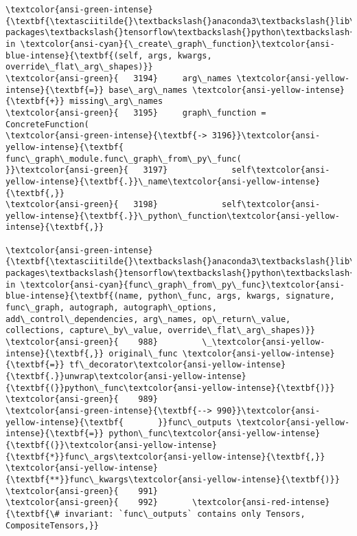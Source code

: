 \documentclass[11pt]{article}
\begin{document}
\begin{Verbatim}[commandchars=\\\{\}, frame=single, framerule=2mm, rulecolor=\color{outerrorbackground}]
\textcolor{ansi-green-intense}{\textbf{\textasciitilde{}\textbackslash{}anaconda3\textbackslash{}lib\textbackslash{}site-packages\textbackslash{}tensorflow\textbackslash{}python\textbackslash{}eager\textbackslash{}function.py}} in \textcolor{ansi-cyan}{\_create\_graph\_function}\textcolor{ansi-blue-intense}{\textbf{(self, args, kwargs, override\_flat\_arg\_shapes)}}
\textcolor{ansi-green}{   3194}     arg\_names \textcolor{ansi-yellow-intense}{\textbf{=}} base\_arg\_names \textcolor{ansi-yellow-intense}{\textbf{+}} missing\_arg\_names
\textcolor{ansi-green}{   3195}     graph\_function = ConcreteFunction(
\textcolor{ansi-green-intense}{\textbf{-> 3196}}\textcolor{ansi-yellow-intense}{\textbf{         func\_graph\_module.func\_graph\_from\_py\_func(
}}\textcolor{ansi-green}{   3197}             self\textcolor{ansi-yellow-intense}{\textbf{.}}\_name\textcolor{ansi-yellow-intense}{\textbf{,}}
\textcolor{ansi-green}{   3198}             self\textcolor{ansi-yellow-intense}{\textbf{.}}\_python\_function\textcolor{ansi-yellow-intense}{\textbf{,}}

\textcolor{ansi-green-intense}{\textbf{\textasciitilde{}\textbackslash{}anaconda3\textbackslash{}lib\textbackslash{}site-packages\textbackslash{}tensorflow\textbackslash{}python\textbackslash{}framework\textbackslash{}func\_graph.py}} in \textcolor{ansi-cyan}{func\_graph\_from\_py\_func}\textcolor{ansi-blue-intense}{\textbf{(name, python\_func, args, kwargs, signature, func\_graph, autograph, autograph\_options, add\_control\_dependencies, arg\_names, op\_return\_value, collections, capture\_by\_value, override\_flat\_arg\_shapes)}}
\textcolor{ansi-green}{    988}         \_\textcolor{ansi-yellow-intense}{\textbf{,}} original\_func \textcolor{ansi-yellow-intense}{\textbf{=}} tf\_decorator\textcolor{ansi-yellow-intense}{\textbf{.}}unwrap\textcolor{ansi-yellow-intense}{\textbf{(}}python\_func\textcolor{ansi-yellow-intense}{\textbf{)}}
\textcolor{ansi-green}{    989} 
\textcolor{ansi-green-intense}{\textbf{--> 990}}\textcolor{ansi-yellow-intense}{\textbf{       }}func\_outputs \textcolor{ansi-yellow-intense}{\textbf{=}} python\_func\textcolor{ansi-yellow-intense}{\textbf{(}}\textcolor{ansi-yellow-intense}{\textbf{*}}func\_args\textcolor{ansi-yellow-intense}{\textbf{,}} \textcolor{ansi-yellow-intense}{\textbf{**}}func\_kwargs\textcolor{ansi-yellow-intense}{\textbf{)}}
\textcolor{ansi-green}{    991} 
\textcolor{ansi-green}{    992}       \textcolor{ansi-red-intense}{\textbf{\# invariant: `func\_outputs` contains only Tensors, CompositeTensors,}}


\end{Verbatim}
\end{document}
